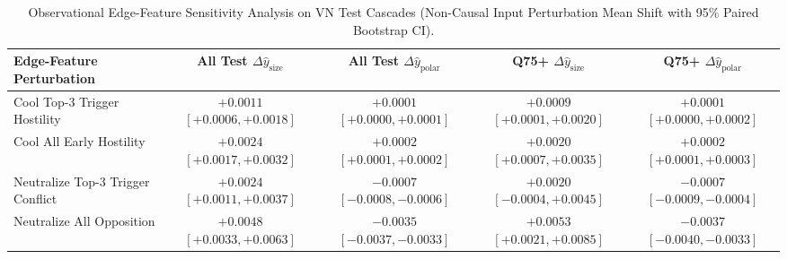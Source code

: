\begin{table}[t]
\centering
\caption{Observational Edge-Feature Sensitivity Analysis on VN Test Cascades (Non-Causal Input Perturbation Mean Shift with 95\% Paired Bootstrap CI).}
\label{tab:mechanisms_vn}
\begin{tabular}{lcccc}
\toprule
Edge-Feature Perturbation & All Test $\Delta \hat{y}_{\mathrm{size}}$ & All Test $\Delta \hat{y}_{\mathrm{polar}}$ & Q75+ $\Delta \hat{y}_{\mathrm{size}}$ & Q75+ $\Delta \hat{y}_{\mathrm{polar}}$ \\
\midrule
Cool Top-3 Trigger Hostility & $+0.0011$ $[+0.0006, +0.0018]$ & $+0.0001$ $[+0.0000, +0.0001]$ & $+0.0009$ $[+0.0001, +0.0020]$ & $+0.0001$ $[+0.0000, +0.0002]$ \\
Cool All Early Hostility & $+0.0024$ $[+0.0017, +0.0032]$ & $+0.0002$ $[+0.0001, +0.0002]$ & $+0.0020$ $[+0.0007, +0.0035]$ & $+0.0002$ $[+0.0001, +0.0003]$ \\
Neutralize Top-3 Trigger Conflict & $+0.0024$ $[+0.0011, +0.0037]$ & $-0.0007$ $[-0.0008, -0.0006]$ & $+0.0020$ $[-0.0004, +0.0045]$ & $-0.0007$ $[-0.0009, -0.0004]$ \\
Neutralize All Opposition & $+0.0048$ $[+0.0033, +0.0063]$ & $-0.0035$ $[-0.0037, -0.0033]$ & $+0.0053$ $[+0.0021, +0.0085]$ & $-0.0037$ $[-0.0040, -0.0033]$ \\
\bottomrule
\end{tabular}
\end{table}
